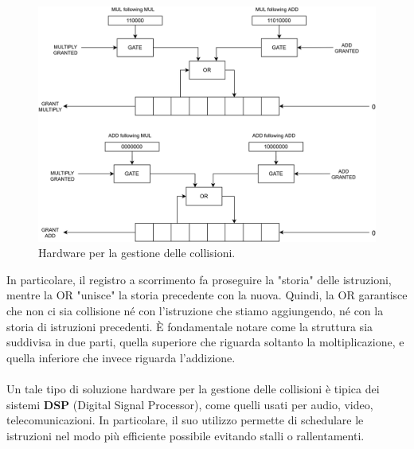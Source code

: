 \begin{figure}[!h]
    \centering
    \includegraphics[width=0.7\linewidth]{img/superscalari_collisioni.png}
    \caption{Hardware per la gestione delle collisioni.}
    \label{fig:hardware-coll}
\end{figure}
In particolare, il registro a scorrimento fa proseguire la "storia" delle istruzioni, mentre la OR "unisce" la storia precedente con la nuova. Quindi, la OR garantisce che non ci sia collisione né con l'istruzione che stiamo aggiungendo, né con la storia di istruzioni precedenti. \MakeUppercase{è} fondamentale notare come la struttura sia suddivisa in due parti, quella superiore che riguarda soltanto la moltiplicazione, e quella inferiore che invece riguarda l'addizione.
\\
\\
Un tale tipo di soluzione hardware per la gestione delle collisioni è tipica dei sistemi \textbf{DSP} (Digital Signal Processor), come quelli usati per audio, video, telecomunicazioni. In particolare, il suo utilizzo permette di schedulare le istruzioni nel modo più efficiente possibile evitando stalli o rallentamenti.